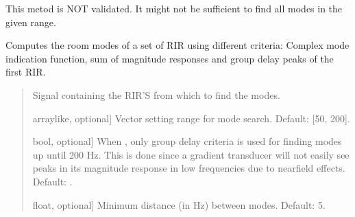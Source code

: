 \documentclass[letterpaper,10pt,english]{sphinxmanual}
\begin{document}

\begin{fulllineitems}
\label{\detokenize{modules/dsptoolbox.room_acoustics:dsptoolbox.room_acoustics.find_modes}}
\pysigstartsignatures
{}
\pysigstopsignatures
\sphinxAtStartPar
This metod is NOT validated. It might not be sufficient to find all
modes in the given range.

\sphinxAtStartPar
Computes the room modes of a set of RIR using different criteria:
Complex mode indication function, sum of magnitude responses and group
delay peaks of the first RIR.
\begin{quote}\begin{description}
\begin{description}
\sphinxlineitem{\sphinxstylestrong{signal}}{[}\sphinxtitleref{Signal}{]}
\sphinxAtStartPar
Signal containing the RIR’S from which to find the modes.

\sphinxlineitem{\sphinxstylestrong{f\_range\_hz}}{[}array\sphinxhyphen{}like, optional{]}
\sphinxAtStartPar
Vector setting range for mode search. Default: {[}50, 200{]}.

\sphinxlineitem{\sphinxstylestrong{proximity\_effect}}{[}bool, optional{]}
\sphinxAtStartPar
When , only group delay criteria is used for finding modes
up until 200 Hz. This is done since a gradient transducer will not
easily see peaks in its magnitude response in low frequencies
due to near\sphinxhyphen{}field effects. Default: .

\sphinxlineitem{\sphinxstylestrong{dist\_hz}}{[}float, optional{]}
\sphinxAtStartPar
Minimum distance (in Hz) between modes. Default: 5.


\end{description}
\end{description}
\end{quote}
\end{fulllineitems}
\end{document}
